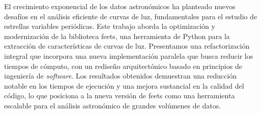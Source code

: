 El crecimiento exponencial de los datos astronómicos ha planteado nuevos desafíos en el análisis eficiente de curvas de luz, fundamentales para el estudio de estrellas variables periódicas. Este trabajo aborda la optimización y modernización de la biblioteca \acrfull{feets}, una herramienta de Python para la extracción de características de curvas de luz. Presentamos una refactorización integral que incorpora una nueva implementación paralela que busca reducir los tiempos de cómputo, con un rediseño arquitectónico basado en principios de ingeniería de \emph{software}. Los resultados obtenidos demuestran una reducción notable en los tiempos de ejecución y una mejora sustancial en la calidad del código, lo que posiciona a la nueva versión de \acrshort{feets} como una herramienta escalable para el análisis astronómico de grandes volúmenes de datos.